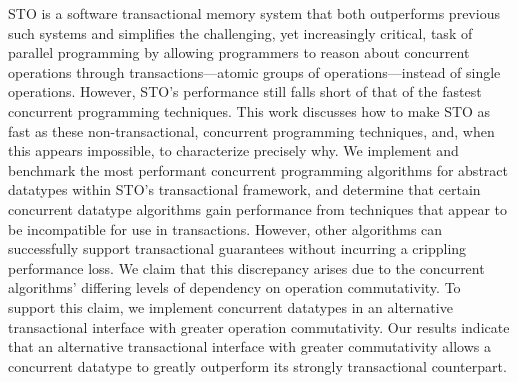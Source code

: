 STO is a software transactional memory system that both outperforms previous such systems and simplifies the challenging, yet increasingly critical, task of parallel programming by allowing programmers to reason about concurrent operations through transactions---atomic groups of operations---instead of single operations.  
However, STO's performance still falls short of that of the fastest concurrent programming techniques. This work discusses how to make STO as fast as these non-transactional, concurrent programming techniques, and, when this appears impossible, to characterize precisely why. 
We implement and benchmark the most performant concurrent programming algorithms for abstract datatypes within STO's transactional framework, and determine that certain concurrent datatype algorithms gain performance from techniques that appear to be incompatible for use in transactions.
However, other algorithms can successfully support transactional guarantees without incurring a crippling performance loss. We claim that this discrepancy arises due to the concurrent algorithms' differing levels of dependency on operation commutativity. To support this claim, we implement concurrent datatypes in an alternative transactional interface with greater operation commutativity. Our results indicate that an alternative transactional interface with greater commutativity allows a concurrent datatype to greatly outperform its strongly transactional counterpart.
